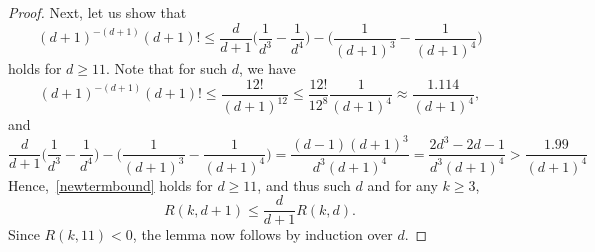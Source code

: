 \documentclass[a4paper, oneside, 11pt]{amsart}
\theoremstyle{definition}
\newcommand{\1}{\mathbbm{1}}
\newcommand{\0}{\mathbf{o}}
\numberwithin{equation}{section}
\begin{document}
\begin{proof}
    Next, let us show that
    \begin{equation}\label{newtermbound} 
        (d+1)^{-(d+1)} (d+1)! \leq \frac{d}{d+1} \big( \frac{1}{d^3}-\frac{1}{d^4} \big) - \Big( \frac{1}{(d+1)^3} - \frac{1}{(d+1)^4} \Big) 
    \end{equation}
    holds for $d \geq 11$. Note that for such $d$, we have
    \[ 
        (d+1)^{-(d+1)} (d+1)! \leq \frac{12!}{(d+1)^{12}} \leq \frac{12!}{12^8} \frac{1}{(d+1)^4} \approx \frac{1.114}{(d+1)^4}, 
    \]
    and
    \[ 
        \frac{d}{d+1} \Big( \frac{1}{d^3}-\frac{1}{d^4} \Big) - \Big( \frac{1}{(d+1)^3} - \frac{1}{(d+1)^4} \Big) = \frac{(d-1)(d+1)^3}{d^3(d+1)^4} = \frac{2d^3-2d-1}{d^3(d+1)^4} > \frac{1.99}{(d+1)^4} 
    \]
    Hence,~\eqref{newtermbound} holds for $d \geq 11$, and thus such $d$ and for any $k\geq 3$,
    \[ 
        R(k,d+1) \leq \frac{d}{d+1} R(k,d). 
    \]
    Since $R(k,11) < 0$, the lemma now follows by induction over $d$.
\end{proof}
\end{document}
